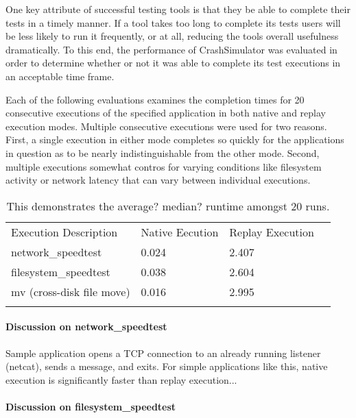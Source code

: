One key attribute of successful testing tools is that they be able to complete their tests in a timely manner.
If a tool takes too long to complete its tests users will be less likely to run it frequently, or at all,
reducing the tools overall usefulness dramatically. To this end, the performance of CrashSimulator was evaluated
in order to determine whether or not it was able to complete its test executions in an acceptable time frame.

Each of the following evaluations examines the completion times for 20 consecutive executions of the specified
application in both native and replay execution modes.  Multiple consecutive executions were used for two
reasons.  First, a single execution in either mode completes so quickly for the applications in question as to
be nearly indistinguishable from the other mode.  Second, multiple executions somewhat contros for varying
conditions like filesystem activity or network latency that can vary between individual executions.

    \begin{table}[H]
        \scriptsize{}
        \begin{tabular}{l  l  l  l}
            \toprule{}
                Execution Description & Native Eecution & Replay Execution\\
                network\_speedtest & 0.024 & 2.407 \\
                filesystem\_speedtest & 0.038 & 2.604 \\
                mv (cross-disk file move) & 0.016 & 2.995 \\
            \bottomrule{}
        \end{tabular}
        \caption{This demonstrates the average? median? 
runtime amongst 20 runs.}
    \end{table}

\paragraph{Discussion on network\_speedtest}

Sample application opens a TCP connection to an already running listener (netcat), sends a message, and
exits. For simple applications like this, native execution is significantly faster than replay execution...

\paragraph{Discussion on filesystem\_speedtest}

